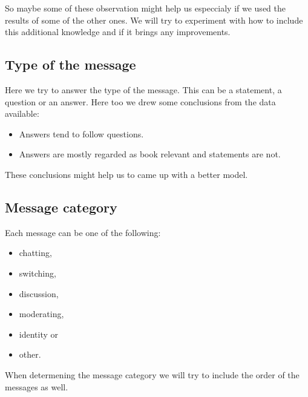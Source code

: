 \documentclass[11pt,a4paper]{article}
\newcommand{\taclpaper}{final version\xspace}
\newcommand{\taclpaper}{submission\xspace}
\begin{document}
So maybe some of these observation might help us especcialy if we used the results of some of the other ones.
We will try to experiment with how to include this additional knowledge and if it brings any improvements.

\subsection{Type of the message}
Here we try to answer the type of the message. 
This can be a statement, a question or an answer.
Here too we drew some conclusions from the data available:

\begin{itemize}
\item{Answers tend to follow questions.}
\item{Answers are mostly regarded as book relevant and statements are not.}
\end{itemize}

These conclusions might help us to came up with a better model.

\subsection{Message category}

Each message can be one of the following:
\begin{itemize}
\item{chatting,}
\item{switching,}
\item{discussion,}
\item{moderating,}
\item{identity or}
\item{other.}
\end{itemize}

When determening the message category we will try to include the order of the messages as well.

\end{document}

